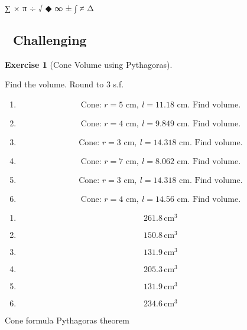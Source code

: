 \documentclass[
  letterpaper,
  DIV=11,
  numbers=noendperiod]{scrreprt}
\theoremstyle{definition}
\newtheorem{exercise}{Exercise}[chapter]
\theoremstyle{remark}
\begin{document}
∑ × π ÷ √ ◆ ∞ ± ∫ ≠ Δ

\subsection{🔴 Challenging}

\begin{exercise}[Cone Volume using
Pythagoras]\protect\hypertarget{exr-cur-6}{}\label{exr-cur-6}

Find the volume. Round to 3 s.f.

\begin{enumerate}
\def\labelenumi{\alph{enumi})}
\item
  \[\text{Cone: }r=5\text{ cm},\ l=11.18\text{ cm. Find volume.}\]
\item
  \[\text{Cone: }r=4\text{ cm},\ l=9.849\text{ cm. Find volume.}\]
\item
  \[\text{Cone: }r=3\text{ cm},\ l=14.318\text{ cm. Find volume.}\]
\item
  \[\text{Cone: }r=7\text{ cm},\ l=8.062\text{ cm. Find volume.}\]
\item
  \[\text{Cone: }r=3\text{ cm},\ l=14.318\text{ cm. Find volume.}\]
\item
  \[\text{Cone: }r=4\text{ cm},\ l=14.56\text{ cm. Find volume.}\]
\end{enumerate}

\begin{tcolorbox}[enhanced jigsaw, opacitybacktitle=0.6, coltitle=black, arc=.35mm, colframe=quarto-callout-tip-color-frame, colback=white, bottomrule=.15mm, left=2mm, colbacktitle=quarto-callout-tip-color!10!white, titlerule=0mm, opacityback=0, title=\textcolor{quarto-callout-tip-color}{\faLightbulb}\hspace{0.5em}{🔍 View Solution}, leftrule=.75mm, breakable, rightrule=.15mm, bottomtitle=1mm, toptitle=1mm, toprule=.15mm]

\begin{enumerate}
\def\labelenumi{\alph{enumi})}
\item
  \[261.8\,\text{cm}^{3}\]
\item
  \[150.8\,\text{cm}^{3}\]
\item
  \[131.9\,\text{cm}^{3}\]
\item
  \[205.3\,\text{cm}^{3}\]
\item
  \[131.9\,\text{cm}^{3}\]
\item
  \[234.6\,\text{cm}^{3}\]
\end{enumerate}

\end{tcolorbox}

{Cone formula} {Pythagoras theorem}

\end{exercise}
\end{document}
